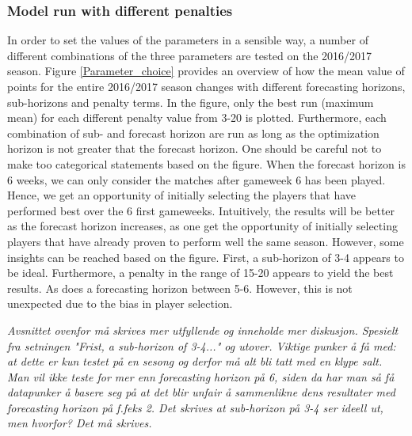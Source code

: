 \subsubsection{Model run with different penalties}
In order to set the values of the parameters in a sensible way, a number of different combinations of the three parameters are tested on the 2016/2017 season. Figure \ref{Parameter_choice} provides an overview of how the mean value of points for the entire 2016/2017 season changes with different forecasting horizons, sub-horizons and penalty terms. In the figure, only the best run (maximum mean) for each different penalty value from 3-20 is plotted. Furthermore, each combination of sub- and forecast horizon are run as long as the optimization horizon is not greater that the forecast horizon. One should be careful not to make too categorical statements based on the figure. When the forecast horizon is 6 weeks, we can only consider the matches after gameweek 6 has been played. Hence, we get an opportunity of initially selecting the players that have performed best over the 6 first gameweeks. Intuitively, the results will be better as the forecast horizon increases, as one get the opportunity of initially selecting players that have already proven to perform well the same season. However, some insights can be reached based on the figure. First, a sub-horizon of 3-4 appears to  be ideal. Furthermore, a penalty in the range of 15-20 appears to yield the best results. As does a forecasting horizon between 5-6. However, this is not unexpected due to the bias in player selection.


\textit{Avsnittet ovenfor må skrives mer utfyllende og inneholde mer diskusjon. Spesielt fra setningen "Frist, a sub-horizon of 3-4..." og utover. Viktige punker å få med: at dette er kun testet på en sesong og derfor må alt bli tatt med en klype salt. Man vil ikke teste for mer enn forecasting horizon på 6, siden da har man så få datapunker å basere seg på at det blir unfair å sammenlikne dens resultater med forecasting horizon på f.feks 2. Det skrives at sub-horizon på 3-4 ser ideell ut, men hvorfor? Det må skrives.}

